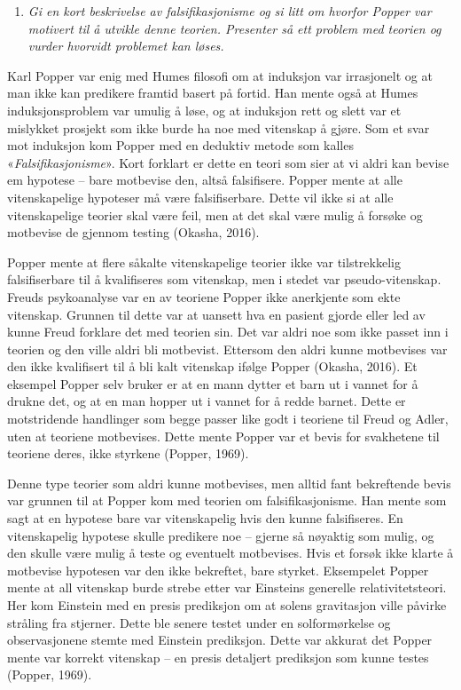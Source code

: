 \documentclass[
  letterpaper,
  DIV=11,
  numbers=noendperiod]{scrreprt}
\providecommand{\tightlist}{%
  \setlength{\itemsep}{0pt}\setlength{\parskip}{0pt}}\usepackage{longtable,booktabs,array}
\begin{document}
\begin{enumerate}
\def\labelenumi{\arabic{enumi}.}
\setcounter{enumi}{1}
\tightlist
\item
  \emph{Gi en kort beskrivelse av falsifikasjonisme og si litt om
  hvorfor Popper var motivert til å utvikle denne teorien. Presenter så
  ett problem med teorien og vurder hvorvidt problemet kan løses.}
\end{enumerate}

Karl Popper var enig med Humes filosofi om at induksjon var irrasjonelt
og at man ikke kan predikere framtid basert på fortid. Han mente også at
Humes induksjonsproblem var umulig å løse, og at induksjon rett og slett
var et mislykket prosjekt som ikke burde ha noe med vitenskap å gjøre.
Som et svar mot induksjon kom Popper med en deduktiv metode som kalles
«\emph{Falsifikasjonisme}». Kort forklart er dette en teori som sier at
vi aldri kan bevise em hypotese -- bare motbevise den, altså
falsifisere. Popper mente at alle vitenskapelige hypoteser må være
falsifiserbare. Dette vil ikke si at alle vitenskapelige teorier skal
være feil, men at det skal være mulig å forsøke og motbevise de gjennom
testing (Okasha, 2016).

Popper mente at flere såkalte vitenskapelige teorier ikke var
tilstrekkelig falsifiserbare til å kvalifiseres som vitenskap, men i
stedet var pseudo-vitenskap. Freuds psykoanalyse var en av teoriene
Popper ikke anerkjente som ekte vitenskap. Grunnen til dette var at
uansett hva en pasient gjorde eller led av kunne Freud forklare det med
teorien sin. Det var aldri noe som ikke passet inn i teorien og den
ville aldri bli motbevist. Ettersom den aldri kunne motbevises var den
ikke kvalifisert til å bli kalt vitenskap ifølge Popper (Okasha, 2016).
Et eksempel Popper selv bruker er at en mann dytter et barn ut i vannet
for å drukne det, og at en man hopper ut i vannet for å redde barnet.
Dette er motstridende handlinger som begge passer like godt i teoriene
til Freud og Adler, uten at teoriene motbevises. Dette mente Popper var
et bevis for svakhetene til teoriene deres, ikke styrkene (Popper,
1969).

Denne type teorier som aldri kunne motbevises, men alltid fant
bekreftende bevis var grunnen til at Popper kom med teorien om
falsifikasjonisme. Han mente som sagt at en hypotese bare var
vitenskapelig hvis den kunne falsifiseres. En vitenskapelig hypotese
skulle predikere noe -- gjerne så nøyaktig som mulig, og den skulle være
mulig å teste og eventuelt motbevises. Hvis et forsøk ikke klarte å
motbevise hypotesen var den ikke bekreftet, bare styrket. Eksempelet
Popper mente at all vitenskap burde strebe etter var Einsteins generelle
relativitetsteori. Her kom Einstein med en presis prediksjon om at
solens gravitasjon ville påvirke stråling fra stjerner. Dette ble senere
testet under en solformørkelse og observasjonene stemte med Einstein
prediksjon. Dette var akkurat det Popper mente var korrekt vitenskap --
en presis detaljert prediksjon som kunne testes (Popper, 1969).
\end{document}
